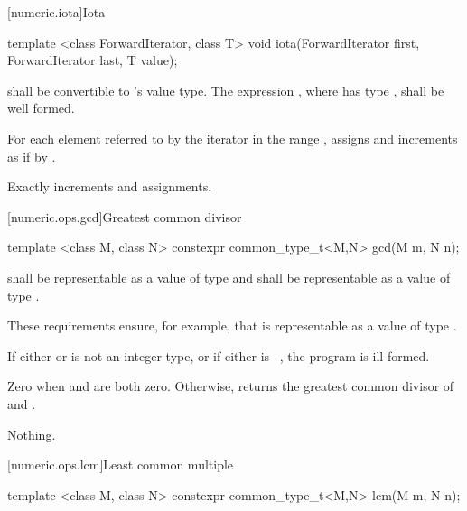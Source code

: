 [numeric.iota]{Iota}

%
\begin{itemdecl}
template <class ForwardIterator, class T>
  void iota(ForwardIterator first, ForwardIterator last, T value);
\end{itemdecl}

\begin{itemdescr}
\pnum
\requires {} shall be convertible to 's value
type. The expression , where  has type , shall
be well formed.

\pnum
\effects For each element referred to by the iterator  in the range
, assigns  and increments  as
if by .

\pnum
\complexity Exactly  increments and assignments.
\end{itemdescr}

[numeric.ops.gcd]{Greatest common divisor}

%
\begin{itemdecl}
template <class M, class N>
  constexpr common_type_t<M,N> gcd(M m, N n);
\end{itemdecl}

\begin{itemdescr}
\pnum
\requires
{} shall be representable as a value of type  and
 shall be representable as a value of type .
\begin{note} These requirements ensure, for example,
that  is representable as a value of type . \end{note}

\pnum
\remarks
If either  or  is not an integer type, or
if either is \cv{}~, the program is ill-formed.

\pnum
\returns
Zero when  and  are both zero.
Otherwise, returns the greatest common divisor of  and .

\pnum
\throws
Nothing.
\end{itemdescr}

[numeric.ops.lcm]{Least common multiple}

%
\begin{itemdecl}
template <class M, class N>
  constexpr common_type_t<M,N> lcm(M m, N n);
\end{itemdecl}

